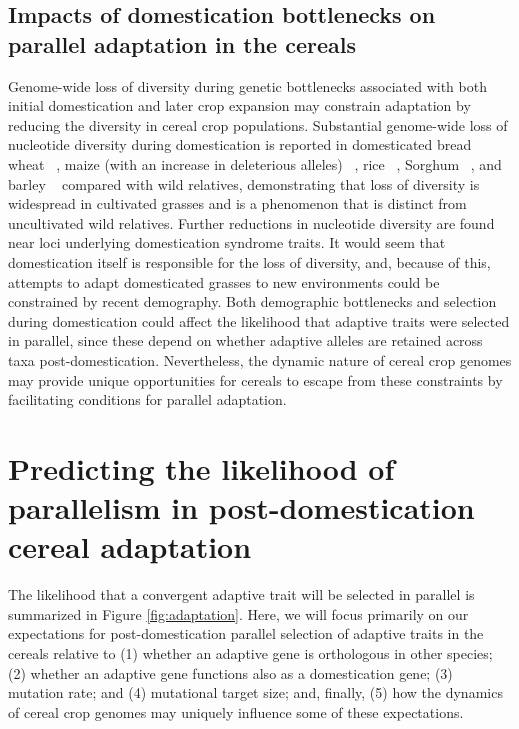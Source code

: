 \documentclass[12pt]{article}
\begin{document}
\subsection*{Impacts of domestication bottlenecks on parallel adaptation in the cereals}
Genome-wide loss of diversity during genetic bottlenecks associated with both initial domestication and later crop expansion may constrain adaptation by reducing the diversity in cereal crop populations.
Substantial genome-wide loss of nucleotide diversity during domestication is reported in domesticated bread wheat ~\citep{Haudry2007}, maize (with an increase in deleterious alleles) ~\citep{pmid9539756, Wang2017}, rice ~\citep{pmid17218640}, Sorghum ~\citep{Hamblin2006}, and barley ~\citep{Kilian2006} compared with wild relatives, demonstrating that loss of diversity is widespread in cultivated grasses and is a phenomenon that is distinct from uncultivated wild relatives.
Further reductions in nucleotide diversity are found near loci underlying domestication syndrome traits.
It would seem that domestication itself is responsible for the loss of diversity, and, because of this, attempts to adapt domesticated grasses to new environments could be constrained by recent demography.  
Both demographic bottlenecks and selection during domestication could affect the likelihood that adaptive traits were selected in parallel, since these depend on whether adaptive alleles are retained across taxa post-domestication. Nevertheless, the dynamic nature of cereal crop genomes may provide unique opportunities for cereals to escape from these constraints by facilitating conditions for parallel adaptation.


\paragraph{}

\section*{Predicting the likelihood of parallelism in post-domestication cereal adaptation}
The likelihood that a convergent adaptive trait will be selected in parallel is summarized in Figure \ref{fig:adaptation}.
Here, we will focus primarily on our expectations for post-domestication parallel selection of adaptive traits in the cereals relative to (1) whether an adaptive gene is orthologous in other species; (2) whether an adaptive gene functions also as a domestication gene; (3) mutation rate; and (4) mutational target size; and, finally, (5) how the dynamics of cereal crop genomes may uniquely influence some of these expectations. 
\end{document}
